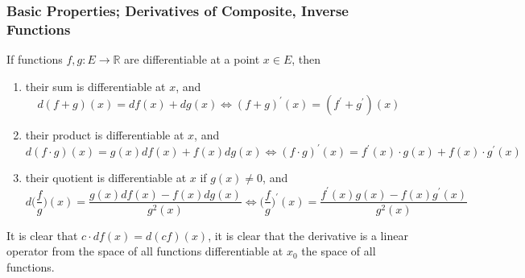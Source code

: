 \subsubsection{Basic Properties; Derivatives of Composite, Inverse Functions}

  \begin{theorem}[Arithmetic]
    If functions $f, g: E \longrightarrow \mathbb{R}$ are differentiable at a point $x \in E$, then 
    \begin{enumerate}
      \item their sum is differentiable at $x$, and 
      \[d(f+g) (x) = df(x) + dg(x) \iff (f+g)^\prime (x) = (f^\prime + g^\prime) (x)\]
      \item their product is differentiable at $x$, and 
      \[d (f \cdot g) (x) = g(x) df(x) + f(x) dg(x) \iff (f \cdot g)^\prime (x) = f^\prime (x) \cdot g(x) + f(x) \cdot g^\prime (x)\]
      \item their quotient is differentiable at $x$ if $g(x) \neq 0$, and 
      \[d \Big( \frac{f}{g} \Big) (x) =  \frac{g(x) df(x) - f(x) dg(x)}{g^2 (x)} \iff \bigg(\frac{f}{g}\bigg)^\prime (x) = \frac{f^\prime (x) g(x) - f(x) g^\prime (x)}{g^2 (x)}\]
    \end{enumerate}
    It is clear that $c\cdot df(x) = d (cf)(x)$, it is clear that the derivative is a linear operator from the space of all functions differentiable at $x_0$ the space of all functions. 
  \end{theorem}
